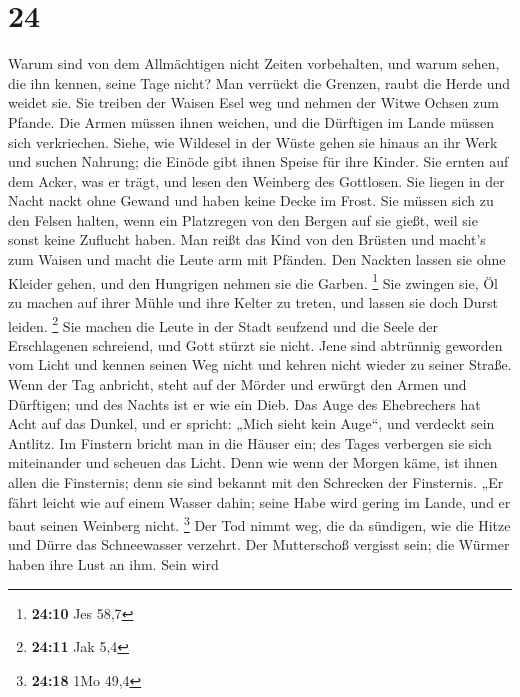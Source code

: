 \hypertarget{section-23}{%
\section{24}\label{section-23}}

 Warum sind von dem Allmächtigen nicht Zeiten vorbehalten,
und warum sehen, die ihn kennen, seine Tage nicht?  Man
verrückt die Grenzen, raubt die Herde und weidet sie.  Sie
treiben der Waisen Esel weg und nehmen der Witwe Ochsen zum Pfande.
 Die Armen müssen ihnen weichen, und die Dürftigen im
Lande müssen sich verkriechen.  Siehe, wie Wildesel in der
Wüste gehen sie hinaus an ihr Werk und suchen Nahrung; die Einöde gibt
ihnen Speise für ihre Kinder.  Sie ernten auf dem Acker,
was er trägt, und lesen den Weinberg des Gottlosen.  Sie
liegen in der Nacht nackt ohne Gewand und haben keine Decke im Frost.
 Sie müssen sich zu den Felsen halten, wenn ein Platzregen
von den Bergen auf sie gießt, weil sie sonst keine Zuflucht haben.
 Man reißt das Kind von den Brüsten und macht's zum Waisen
und macht die Leute arm mit Pfänden.  Den Nackten lassen
sie ohne Kleider gehen, und den Hungrigen nehmen sie die Garben.
\footnote{\textbf{24:10} Jes 58,7}  Sie zwingen sie, Öl
zu machen auf ihrer Mühle und ihre Kelter zu treten, und lassen sie doch
Durst leiden. \footnote{\textbf{24:11} Jak 5,4}  Sie
machen die Leute in der Stadt seufzend und die Seele der Erschlagenen
schreiend, und Gott stürzt sie nicht.  Jene sind
abtrünnig geworden vom Licht und kennen seinen Weg nicht und kehren
nicht wieder zu seiner Straße.  Wenn der Tag anbricht,
steht auf der Mörder und erwürgt den Armen und Dürftigen; und des Nachts
ist er wie ein Dieb.  Das Auge des Ehebrechers hat Acht
auf das Dunkel, und er spricht: „Mich sieht kein Auge``, und verdeckt
sein Antlitz.  Im Finstern bricht man in die Häuser ein;
des Tages verbergen sie sich miteinander und scheuen das Licht.
 Denn wie wenn der Morgen käme, ist ihnen allen die
Finsternis; denn sie sind bekannt mit den Schrecken der Finsternis.
 „Er fährt leicht wie auf einem Wasser dahin; seine Habe
wird gering im Lande, und er baut seinen Weinberg nicht. \footnote{\textbf{24:18}
  1Mo 49,4}  Der Tod nimmt weg, die da sündigen, wie die
Hitze und Dürre das Schneewasser verzehrt.  Der
Mutterschoß vergisst sein; die Würmer haben ihre Lust an ihm. Sein wird
